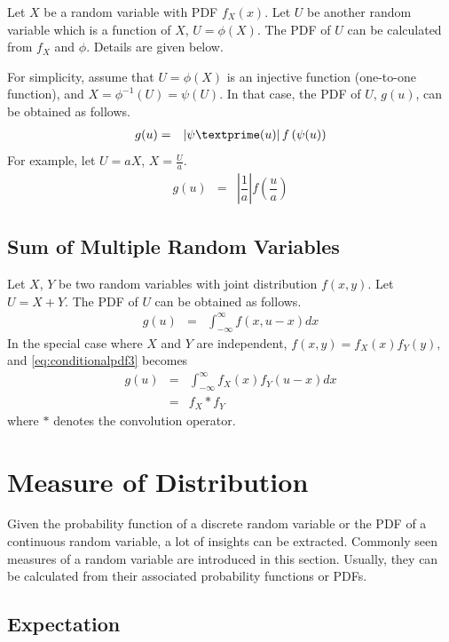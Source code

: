Let $X$ be a random variable with PDF $f_X(x)$. Let $U$ be another random variable which is a function of $X$, $U=\phi(X)$. The PDF of $U$ can be calculated from $f_X$ and $\phi$. Details are given below.

For simplicity, assume that $U=\phi(X)$ is an injective function (one-to-one function), and $X=\phi^{-1}(U)=\psi(U)$. In that case, the PDF of $U$, $g(u)$, can be obtained as follows.
\begin{eqnarray}
  g(u) &=& \left|\psi\textprime(u)\right|f\left(\psi(u)\right) \nonumber
\end{eqnarray}
For example, let $U=aX$, $X=\frac{U}{a}$.
\begin{eqnarray}
  g(u) &=& \left|\dfrac{1}{a}\right|f\left(\dfrac{u}{a}\right) \nonumber
\end{eqnarray}

\subsection{Sum of Multiple Random Variables}

Let $X$, $Y$ be two random variables with joint distribution $f(x, y)$. Let $U=X+Y$. The PDF of $U$ can be obtained as follows.
\begin{eqnarray}
  g(u) &=& \int_{-\infty}^{\infty} f(x, u-x)dx \label{eq:conditionalpdf3}
\end{eqnarray}
In the special case where $X$ and $Y$ are independent, $f(x, y) = f_X(x)f_Y(y)$, and \eqref{eq:conditionalpdf3} becomes
\begin{eqnarray}
  g(u) &=& \int_{-\infty}^{\infty} f_X(x)f_Y(u-x)dx \nonumber \\
  &=& f_X * f_Y \nonumber
\end{eqnarray}
where $*$ denotes the convolution operator.

\section{Measure of Distribution}

Given the probability function of a discrete random variable or the PDF of a continuous random variable, a lot of insights can be extracted. Commonly seen measures of a random variable are introduced in this section. Usually, they can be calculated from their associated probability functions or PDFs.

\subsection{Expectation}

